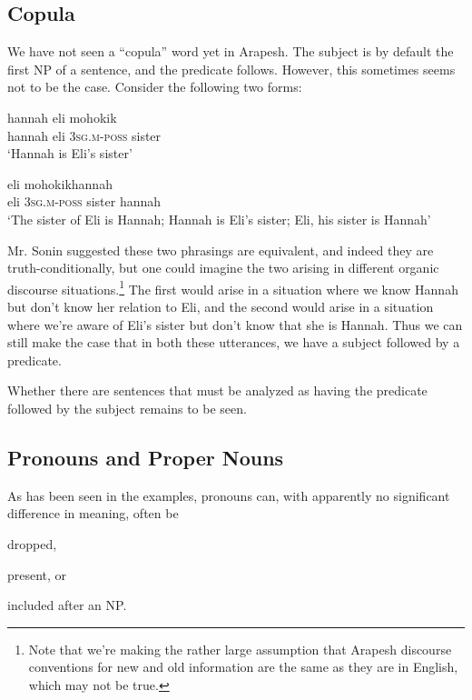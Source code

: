 \documentclass[pdftex,12pt,letterpaper]{article}
\let\ipa\textipa
\def\sw{\ipa{\super w}}
\begin{document}
 \subsection{Copula}

 We have not seen a ``copula'' word yet in Arapesh. The subject is by default the first NP of a sentence, and the predicate follows. However, this sometimes seems not to be the case. Consider the following two forms:

 \begin{exe}
 \ex 
 \gll hannah eli \ipa{@n@n-ik} mohok\sw ik\sw \\
 hannah eli \textsc{3sg.m-poss} sister \\
 \trans `Hannah is Eli's sister'

 \ex 
 \gll eli \ipa{@n@n-ik} mohok\sw ik\sw hannah  \\
 eli \textsc{3sg.m-poss} sister hannah\\
 \trans `The sister of Eli is Hannah; Hannah is Eli's sister; Eli, his sister is Hannah'
 \end{exe}

 \noindent Mr. Sonin suggested these two phrasings are equivalent, and indeed they are truth-conditionally, but one could imagine the two arising in different organic discourse situations.\footnote{Note that we're making the rather large assumption that Arapesh discourse conventions for new and old information are the same as they are in English, which may not be true.} The first would arise in a situation where we know Hannah but don't know her relation to Eli, and the second would arise in a situation where we're aware of Eli's sister but don't know that she is Hannah. Thus we can still make the case that in both these utterances, we have a subject followed by a predicate. 

 Whether there are sentences that must be analyzed as having the predicate followed by the subject remains to be seen. 

 \subsection{Pronouns and Proper Nouns}

 As has been seen in the examples, pronouns can, with apparently no significant difference in meaning, often be \begin{inparaenum}[(a)] \item dropped, \item present, or \item included after an NP.\end{inparaenum}
\end{document}
